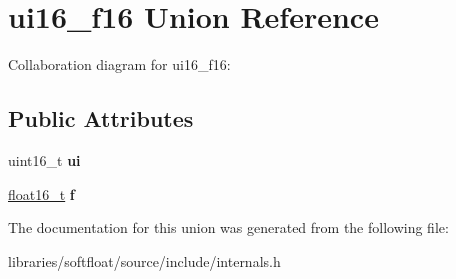 \hypertarget{unionui16__f16}{}\section{ui16\+\_\+f16 Union Reference}
\label{unionui16__f16}


Collaboration diagram for ui16\+\_\+f16\+:
\subsection*{Public Attributes}
\begin{DoxyCompactItemize}
\item 
\mbox{\label{unionui16__f16_aac6c7d977adfc50a60af439130126fc4}} 
uint16\+\_\+t {\bfseries ui}
\item 
\mbox{\label{unionui16__f16_ab323bc7bebcf8d648c2e9135482fde81}} 
\mbox{\hyperlink{structfloat16__t}{float16\+\_\+t}} {\bfseries f}
\end{DoxyCompactItemize}


The documentation for this union was generated from the following file\+:\begin{DoxyCompactItemize}
\item 
libraries/softfloat/source/include/internals.\+h\end{DoxyCompactItemize}
